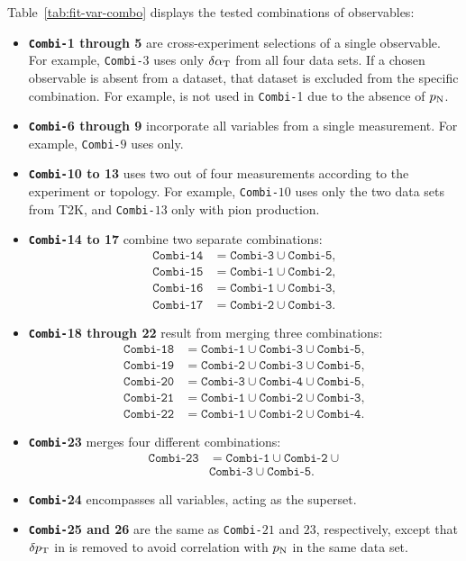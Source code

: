 Table~\ref{tab:fit-var-combo} displays the tested combinations of observables:
\begin{itemize}
    \item \textbf{\texttt{Combi-}1 through 5} are cross-experiment selections of a single observable. 
For example, \texttt{Combi-}$3$ uses only $\delta\alpha_\textrm{T}$ from all four data sets. If a chosen observable is absent from a dataset, that dataset is excluded from the specific combination. 
For example, \ttkzpi is not used in \texttt{Combi-}1 due to the absence of $p_\textrm{N}$.
\item \textbf{\texttt{Combi-}6 through 9} incorporate all variables from a single measurement. For example, \texttt{Combi-}$9$ uses \minpiz only.
\item \textbf{\texttt{Combi-}10 to 13} uses two out of four measurements according to the experiment or topology. For example, \texttt{Combi-}$10$ uses only the two data sets from T2K, and \texttt{Combi-}$13$  only with pion production. 
\item \textbf{\texttt{Combi-}14 to 17} combine two separate combinations:
\begin{align*}
\texttt{Combi-14} &= \texttt{Combi-3} \cup \texttt{Combi-5},\\
\texttt{Combi-15} &= \texttt{Combi-1} \cup \texttt{Combi-2},\\
\texttt{Combi-16} &= \texttt{Combi-1} \cup \texttt{Combi-3},\\
\texttt{Combi-17} &= \texttt{Combi-2} \cup \texttt{Combi-3}.
\end{align*}
\item \textbf{\texttt{Combi-}18 through 22} result from merging three combinations:
\begin{align*}
\texttt{Combi-18} &= \texttt{Combi-1} \cup \texttt{Combi-3} \cup \texttt{Combi-5},\\
\texttt{Combi-19} &= \texttt{Combi-2} \cup \texttt{Combi-3} \cup \texttt{Combi-5},\\
\texttt{Combi-20} &= \texttt{Combi-3} \cup \texttt{Combi-4} \cup \texttt{Combi-5},\\
\texttt{Combi-21} &= \texttt{Combi-1} \cup \texttt{Combi-2} \cup \texttt{Combi-3},\\
\texttt{Combi-22} &= \texttt{Combi-1} \cup \texttt{Combi-2} \cup \texttt{Combi-4}.
\end{align*}
\item \textbf{\texttt{Combi-}23} merges four different combinations:
\begin{align*}
\texttt{Combi-23} &= \texttt{Combi-1} \cup \texttt{Combi-2} \cup \\
& \texttt{Combi-3} \cup \texttt{Combi-5}.
\end{align*}
\item \textbf{\texttt{Combi-}24} encompasses all variables, acting as the superset.
\item \textbf{\texttt{Combi-}25 and 26} are the same as \texttt{Combi-}$21$ and $23$, respectively, except that $\delta p_\textrm{T}$ in \minzpi is removed to avoid correlation with $p_\textrm{N}$ in the same data set.
\end{itemize}

